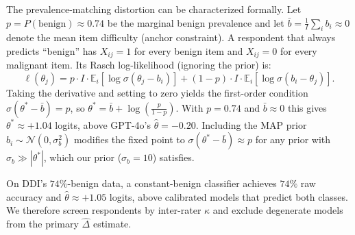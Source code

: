 \documentclass{article}
\begin{document}
 The prevalence-matching distortion can be characterized formally. Let $p = P(\text{benign}) \approx 0.74$ be the marginal benign prevalence and let $\bar b = \frac{1}{I}\sum_i b_i \approx 0$ denote the mean item difficulty (anchor constraint). A respondent that always predicts ``benign'' has $X_{ij} = 1$ for every benign item and $X_{ij} = 0$ for every malignant item. Its Rasch log-likelihood (ignoring the prior) is:
\begin{equation}
\ell(\theta_j) = p \cdot I \cdot \mathbb{E}_i[\log \sigma(\theta_j - b_i)] + (1-p) \cdot I \cdot \mathbb{E}_i[\log \sigma(b_i - \theta_j)].
\end{equation}
Taking the derivative and setting to zero yields the first-order condition $\sigma(\theta^* - \bar b) = p$, so $\theta^* = \bar b + \log\!\left(\tfrac{p}{1-p}\right)$. With $p = 0.74$ and $\bar b \approx 0$ this gives $\theta^* \approx +1.04$ logits, above GPT-4o's $\hat\theta = -0.20$. Including the MAP prior $b_i \sim \mathcal{N}(0, \sigma_b^2)$ modifies the fixed point to $\sigma(\theta^* - \bar b) \approx p$ for any prior with $\sigma_b \gg |\theta^*|$, which our prior ($\sigma_b = 10$) satisfies.

On DDI's $74\%$-benign data, a constant-benign classifier achieves $74\%$ raw accuracy and $\hat\theta \approx +1.05$ logits, above calibrated models that predict both classes. We therefore screen respondents by inter-rater $\kappa$ and exclude degenerate models from the primary $\hat\Delta$ estimate.
\end{document}

